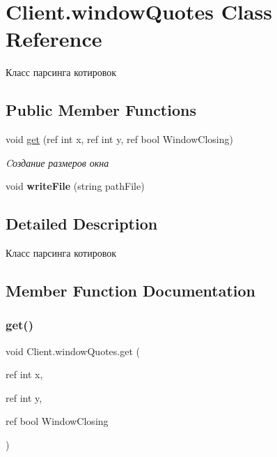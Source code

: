 \hypertarget{class_client_1_1window_quotes}{}\section{Client.\+window\+Quotes Class Reference}
\label{class_client_1_1window_quotes}


Класс парсинга котировок  


\subsection*{Public Member Functions}
\begin{DoxyCompactItemize}
\item 
void \hyperlink{class_client_1_1window_quotes_a34aa54dd362ea6d68dccfd4b70d9378c}{get} (ref int x, ref int y, ref bool Window\+Closing)
\begin{DoxyCompactList}\small\item\em Cоздание размеров окна \end{DoxyCompactList}\item 
\hypertarget{class_client_1_1window_quotes_a34f9f7839fd79c476755ef19702321f7}{}\label{class_client_1_1window_quotes_a34f9f7839fd79c476755ef19702321f7} 
void {\bfseries write\+File} (string path\+File)
\end{DoxyCompactItemize}


\subsection{Detailed Description}
Класс парсинга котировок 



\subsection{Member Function Documentation}
\hypertarget{class_client_1_1window_quotes_a34aa54dd362ea6d68dccfd4b70d9378c}{}\label{class_client_1_1window_quotes_a34aa54dd362ea6d68dccfd4b70d9378c} 
\subsubsection{\texorpdfstring{get()}{get()}}
{\footnotesize\ttfamily void Client.\+window\+Quotes.\+get (\begin{DoxyParamCaption}\item[{ref int}]{x,  }\item[{ref int}]{y,  }\item[{ref bool}]{Window\+Closing }\end{DoxyParamCaption})\hspace{0.3cm}{\ttfamily [inline]}}



